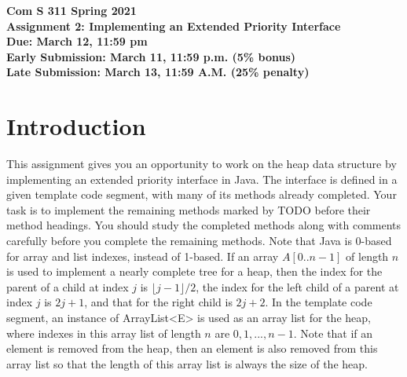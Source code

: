 \def\baselinestretch{1.0}
\textwidth=6.0in
\textheight=8.5in



\pagestyle{plain}

\begin{center}
{\bf Com S 311 Spring 2021 \\}
{\Large \bf Assignment 2: Implementing an Extended Priority Interface \\}
{\bf Due: March 12, 11:59 pm \\}
{\bf Early Submission: March 11, 11:59 p.m. (5\% bonus) \\}
{\bf Late Submission: March 13, 11:59 A.M. (25\% penalty) }
\end{center}

\section*{Introduction}

This assignment gives you an opportunity to work on the heap data structure
by implementing an extended priority interface in Java.
The interface is defined in a given template code segment, with
many of its methods already completed.
Your task is to implement the remaining methods marked by TODO
before their method headings. You should study the completed methods
along with comments carefully before you complete the remaining methods.
Note that Java is 0-based for array and list indexes, instead of 1-based.
If an array $A[0 .. n-1]$ of length $n$ is used to implement a nearly complete
tree for a heap, then the index for the parent of a child at index $j$
is $\lfloor{j-1}\rfloor / 2$, the index for the left child of a parent
at index $j$ is $2j+1$, and that for the right child is $2j+2$.
In the template code segment, an instance of ArrayList{\textless}E{\textgreater} is used
as an array list for the heap, where indexes in this array list of length $n$
are $0, 1, ..., n-1$. Note that if an element is removed from the heap,
then an element is also removed from this array list so that
the length of this array list is always the size of the heap.

